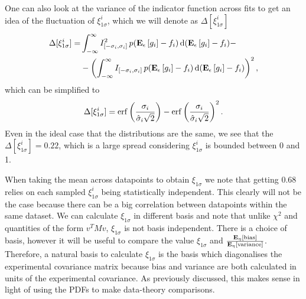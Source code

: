 One can also look at the variance of the indicator function across fits to get
an idea of the fluctuation of $\xi_{1\sigma}^{i}$, which we will denote as
$\Delta[\xi_{1\sigma}^{i}]$
\begin{equation}
    \label{eq:XiIVar}
    \begin{split}
        \Delta[\xi_{1\sigma}^{i}] 
        =& \int_{-\infty}^{\infty} I_{[-\sigma_i, \sigma_i]}^2\, 
            p(\mathbf{E}_{\epsilon}\left[ g_i \right] - f_i)\,
            {\rm d}(\mathbf{E}_{\epsilon}\left[ g_i \right] - f_i) - \\
        &- \left( \int_{-\infty}^{\infty} I_{[-\sigma_i, \sigma_i]}\,
            p(\mathbf{E}_{\epsilon}\left[ g_i \right] - f_i)\,
            {\rm d}(\mathbf{E}_{\epsilon}\left[ g_i \right] - f_i) \right)^2,
    \end{split}
\end{equation}
which can be simplified to
\begin{equation}
    \label{eq:XiIVarSimplified}
    \Delta[\xi_{1\sigma}^{i}] =
    {\rm erf} \left( \frac{\sigma_i}{\hat{\sigma}_i \sqrt{2}}\right) -
    {\rm erf} \left( \frac{\sigma_i}{\hat{\sigma}_i \sqrt{2}}\right)^2.
\end{equation}
Even in the ideal case that the distributions are the same, we see that the
$\Delta[\xi_{1\sigma}^{i}] = 0.22$, which is a large spread considering
$\xi_{1\sigma}^{i}$ is bounded between 0 and 1.

When taking the mean across datapoints to obtain $\xi_{1\sigma}$ we note that
getting 0.68 relies on each sampled $\xi_{1\sigma}^{i}$ being statistically
independent. This clearly will not be the case because there can be a big
correlation between datapoints within the same dataset. We can calculate
$\xi_{1\sigma}$ in different basis and note that unlike $\chi^2$ and quantities
of the form $v^T M v$, $\xi_{1\sigma}$ is not basis independent. There is a
choice of basis, however it will be useful to compare the value $\xi_{1\sigma}$
and $\frac{\mathbf{E}_{\eta}\left[ {\rm bias} \right]}{\mathbf{E}_{\eta}\left[ {\rm variance} \right]}$. Therefore, a natural basis to
calculate $\xi_{1\sigma}$ is the basis which diagonalises the experimental
covariance matrix because bias and variance are both calculated in units of the
experimental
covariance. As previously discussed, this makes sense in light of using the PDFs
to make data-theory comparisons.
